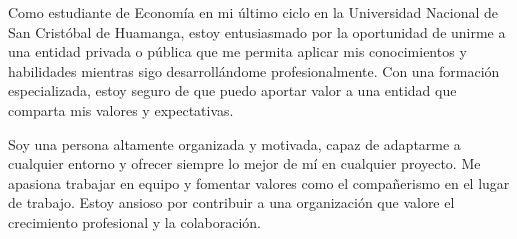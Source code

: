 
\par{

    Como estudiante de Economía en mi último ciclo en la Universidad Nacional de San Cristóbal de Huamanga, estoy entusiasmado por la oportunidad de unirme a una entidad privada o pública que me permita aplicar mis conocimientos y habilidades mientras sigo desarrollándome profesionalmente. Con una formación especializada, estoy seguro de que puedo aportar valor a una entidad que comparta mis valores y expectativas.

    Soy una persona altamente organizada y motivada, capaz de adaptarme a cualquier entorno y ofrecer siempre lo mejor de mí en cualquier proyecto. Me apasiona trabajar en equipo y fomentar valores como el compañerismo en el lugar de trabajo. Estoy ansioso por contribuir a una organización que valore el crecimiento profesional y la colaboración. 






}